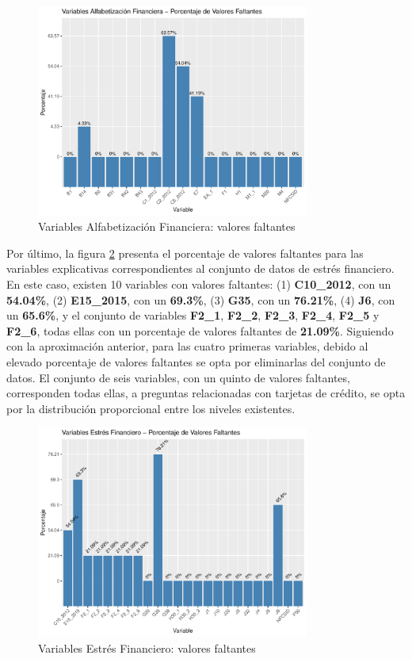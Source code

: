 \documentclass[a4paper, 11pt]{article}
\begin{document}
\begin{figure}[ht]
    \centering
    \includegraphics[width=0.8\textwidth]{images/Capabilities_Features__Missing_Values.pdf} 
    \caption{Variables Alfabetización Financiera: valores faltantes}
    \label{fig:capabilities_features_missing_values}
\end{figure}

Por último, la figura \ref{fig:stress_features_missing_values} presenta el porcentaje de valores
faltantes para las variables explicativas correspondientes al conjunto de datos de estrés
financiero. En este caso, existen 10 variables con valores faltantes: (1) \textbf{C10\_2012}, con 
un \textbf{54.04\%}, (2) \textbf{E15\_2015}, con un \textbf{69.3\%}, (3) \textbf{G35}, con un 
\textbf{76.21\%}, (4) \textbf{J6}, con un \textbf{65.6\%}, y el conjunto de variables
\textbf{F2\_1}, \textbf{F2\_2}, \textbf{F2\_3}, \textbf{F2\_4}, \textbf{F2\_5} y \textbf{F2\_6}, 
todas ellas con un porcentaje de valores faltantes de \textbf{21.09\%}. Siguiendo con la 
aproximación anterior, para las cuatro primeras variables, debido al elevado porcentaje de 
valores faltantes se opta por eliminarlas del conjunto de datos. El conjunto de seis variables,
con un quinto de valores faltantes, corresponden todas ellas, a preguntas relacionadas con 
tarjetas de crédito, se opta por la distribución proporcional entre los niveles existentes.

\begin{figure}[ht]
    \centering
    \includegraphics[width=0.8\textwidth]{images/Stress_Features__Missing_Values.pdf} 
    \caption{Variables Estrés Financiero: valores faltantes}
    \label{fig:stress_features_missing_values}
\end{figure}
\end{document}
